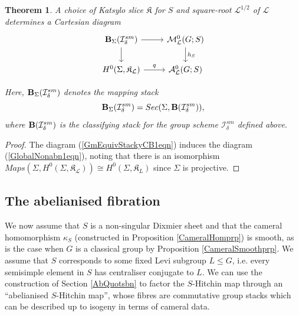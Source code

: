 \documentclass{amsart}
\newtheorem{theorem}{Theorem}
\theoremstyle{remark}
\numberwithin{theorem}{section}
\numberwithin{equation}{section}
\begin{document}
\begin{theorem}\label{GlobalNonabnthm}
  A choice of Katsylo slice $\mathfrak{K}$ for $S$ and square-root $\mathcal L^{1/2}$ of $\mathcal L$ determines a Cartesian diagram
  \begin{equation}\label{GlobalNonabn1eqn}
\begin{tikzcd}
{\bf B}_\Sigma(\mathcal I_{\delta}^{sm}) \arrow[d] \arrow[r] & \mathcal M^0_\mathcal L(G;S) \arrow[d, "h_S"] \\
{H^0(\Sigma,\mathfrak{K}_\mathcal L)} \arrow[r, "q"]         & \mathcal A^0_\mathcal L(G;S)                 
\end{tikzcd}
  \end{equation}
  
  Here, ${\bf B}_\Sigma(\mathcal I_{\delta}^{sm})$ denotes the mapping stack
  \begin{equation}\label{GlobalNonabn2eqn}
      {\bf B}_\Sigma(\mathcal I_{\delta}^{sm}) = Sec(\Sigma, {\bf B}(\mathcal I_{\delta}^{sm})),
  \end{equation}
  where ${\bf B}(\mathcal I_{\mathcal \delta}^{sm})$ is the classifying stack for the group scheme $\mathcal I_{\mathcal \delta}^{sm}$ defined above.
\end{theorem}

\begin{proof}
The diagram (\ref{GmEquivStackyCB1eqn}) induces the diagram (\ref{GlobalNonabn1eqn}), noting that there is an isomorphism $Maps(\Sigma,H^0(\Sigma,\mathfrak{K}_\mathcal L)) \cong H^0(\Sigma,\mathfrak{K}_L)$ since $\Sigma$ is projective.
\end{proof}

\subsection{The abelianised fibration}\label{IntAbFibrnsbn}

We now assume that $S$ is a non-singular Dixmier sheet and that the cameral homomorphism $\kappa_S$ (constructed in Proposition \ref{CameralHomprp}) is smooth, as is the case when $G$ is a classical group by Proposition \ref{CameralSmoothprp}. We assume that $S$ corresponds to some fixed Levi subgroup $L\leq G$, i.e. every semisimple element in $S$ has centraliser conjugate to $L$. We can use the construction of Section \ref{AbQuotsbn} to factor the $S$-Hitchin map through an ``abelianised $S$-Hitchin map'', whose fibres are commutative group stacks which can be described up to isogeny in terms of cameral data.
\end{document}
